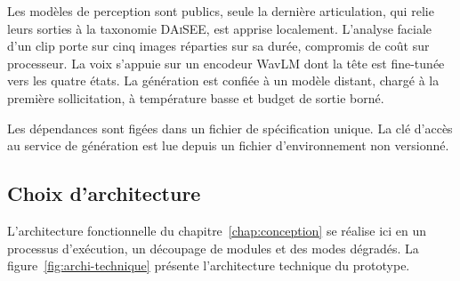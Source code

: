 Les modèles de perception sont publics, seule la dernière
articulation, qui relie leurs sorties à la taxonomie \textsc{DAiSEE},
est apprise localement. L'analyse faciale d'un clip porte sur cinq
images réparties sur sa durée, compromis de coût sur processeur.
La voix s'appuie sur un encodeur WavLM dont la tête est fine-tunée
vers les quatre états. La génération est confiée à un modèle distant,
chargé à la première sollicitation, à température basse et budget de
sortie borné.

Les dépendances sont figées dans un fichier de spécification unique.
La clé d'accès au service de génération est lue depuis un fichier
d'environnement non versionné. 

\subsection{Choix d'architecture}
\label{subsec:choix-archi}

L'architecture fonctionnelle du chapitre~\ref{chap:conception} se
réalise ici en un processus d'exécution, un découpage de modules et
des modes dégradés.
La figure~\ref{fig:archi-technique} présente l'architecture technique
du prototype.

